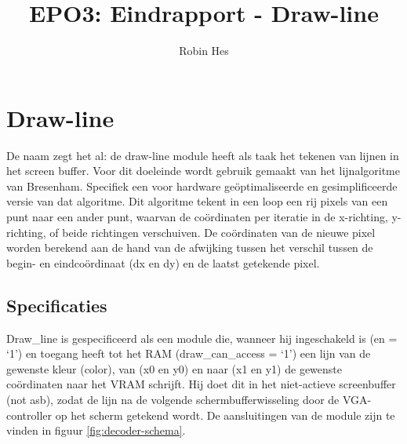 \documentclass{scrartcl} %
\author{Robin Hes}
\title{EPO3: Eindrapport - Draw-line}
\begin{document}
\section{Draw-line}
\label{sec:draw-line}
De naam zegt het al: de draw-line module heeft als taak het tekenen van lijnen in het screen buffer. Voor dit doeleinde wordt gebruik gemaakt van het lijnalgoritme van Bresenham. Specifiek een voor hardware geöptimaliseerde en gesimplificeerde versie van dat algoritme. \cite{line-alg} Dit algoritme tekent in een loop een rij pixels van een punt naar een ander punt, waarvan de coördinaten per iteratie in de x-richting, y-richting, of beide richtingen verschuiven. De coördinaten van de nieuwe pixel worden berekend aan de hand van de afwijking tussen het verschil tussen de begin- en eindcoördinaat (dx en dy) en de laatst getekende pixel.

\subsection{Specificaties}
Draw\_line is gespecificeerd als een module die, wanneer hij ingeschakeld is (en = `1') en toegang heeft tot het RAM (draw\_can\_access = `1') een lijn van de gewenste kleur (color), van (x0 en y0) en naar (x1 en y1) de gewenste coördinaten naar het VRAM schrijft. Hij doet dit in het niet-actieve screenbuffer (not asb), zodat de lijn na de volgende schermbufferwisseling door de VGA-controller op het scherm getekend wordt. De aansluitingen van de module zijn te vinden in figuur \ref{fig:decoder-schema}.
\end{document}
